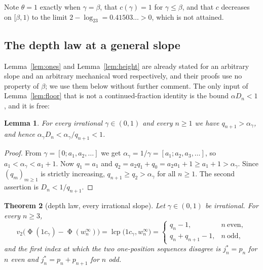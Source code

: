 \documentclass[11pt,reqno]{amsart}
\theoremstyle{plain}
\newtheorem{theorem}{Theorem}[section]
\newtheorem{lemma}[theorem]{Lemma}
\theoremstyle{definition}
\newcommand{\vt}{v_2}
\newcommand{\lcp}{\operatorname{lcp}}
\DeclareMathOperator{\Ph}{\Phi}
\begin{document}
\noindent Note $\theta=1$ exactly when $\gamma=\beta$, that $c(\gamma)=1$ for
$\gamma\le\beta$, and that $c$ decreases on $[\beta,1)$ to the limit
$2-\log_23=0.41503\ldots>0$, which is not attained.

\subsection*{The depth law at a general slope}

Lemma~\ref{lem:ones} and Lemma~\ref{lem:height} are already stated for an
arbitrary slope and an arbitrary mechanical word respectively, and their proofs
use no property of $\beta$; we use them below without further comment. The only
input of Lemma~\ref{lem:floor} that is not a continued-fraction identity is the
bound $\alpha D_n<1$, and it is free:

\begin{lemma}\label{lem:autothreshold}
For every irrational $\gamma\in(0,1)$ and every $n\ge1$ we have
$q_{n+1}>\alpha_\gamma$, and hence
$\alpha_\gamma D_n<\alpha_\gamma/q_{n+1}<1$.
\end{lemma}

\begin{proof}
From $\gamma=[0;a_1,a_2,\dots]$ we get $\alpha_\gamma=1/\gamma=[a_1;a_2,a_3,\dots]$,
so $a_1<\alpha_\gamma<a_1+1$. Now $q_1=a_1$ and $q_2=a_2q_1+q_0=a_2a_1+1\ge
a_1+1>\alpha_\gamma$. Since $(q_m)_{m\ge1}$ is strictly increasing,
$q_{n+1}\ge q_2>\alpha_\gamma$ for all $n\ge1$. The second assertion is
$D_n<1/q_{n+1}$.
\end{proof}

\begin{theorem}[depth law, every irrational slope]\label{thm:alldepth}
Let $\gamma\in(0,1)$ be irrational. For every $n\ge 3$,
\[
\vt\bigl(\Ph(1c_\gamma)-\Ph(w_n^\infty)\bigr)=\lcp\bigl(1c_\gamma,w_n^\infty\bigr)
=\begin{cases}
q_n-1, & n\ \text{even},\\[2pt]
q_n+q_{n+1}-1, & n\ \text{odd},
\end{cases}
\]
and the first index at which the two one-position sequences disagree is
$j^{*}_n=p_n$ for $n$ even and $j^{*}_n=p_n+p_{n+1}$ for $n$ odd.
\end{theorem}
\end{document}
